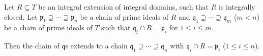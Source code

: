 Let $R \subseteq T$ be an integral extension of integral domains,
such that $R$ is integrally closed.
Let $\mathfrak{p}_1\supseteq \cdots \supseteq \mathfrak{p}_n$ be a chain
of prime ideals of $R$ and $\mathfrak{q}_1 \supseteq \cdots \supseteq \mathfrak{q}_m$
($m < n$) be a chain of prime ideals of $T$ such that $\mathfrak{q}_i\cap R = \mathfrak{p}_i$
for $1\leq i\leq m$.

Then the chain of $\mathfrak{q}$s extends to a chain $\mathfrak{q}_1\supseteq \cdots \supseteq \mathfrak{q}_n$
with $\mathfrak{q}_i\cap R = \mathfrak{p}_i$ ($1\leq i\leq n$).
